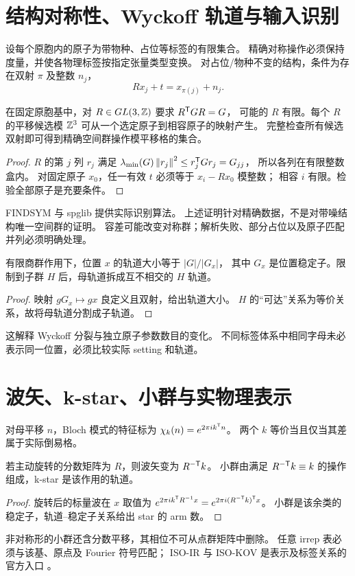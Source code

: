 \section{结构对称性、Wyckoff 轨道与输入识别}\label{sec:symmetry}
设每个原胞内的原子为带物种、占位等标签的有限集合。
精确对称操作必须保持度量，并使各物理标签按指定张量类型变换。
对占位/物种不变的结构，条件为存在双射 $\pi$ 及整数 $n_j$，
\[
 Rx_j+t=x_{\pi(j)}+n_j.
\]
\begin{proposition}[理想输入下的有限对称搜索]
在固定原胞基中，对 $R\in GL(3,\mathbb Z)$ 要求 $R^\mathsf T GR=G$，
可能的 $R$ 有限。每个 $R$ 的平移候选模 $\mathbb Z^3$ 可从一个选定原子到相容原子的映射产生。
完整检查所有候选双射即可得到精确空间群操作模平移格的集合。
\end{proposition}
\begin{proof}
$R$ 的第 $j$ 列 $r_j$ 满足
$\lambda_{\min}(G)\left\lVert r_j\right\rVert^2\leq r_j^\mathsf T Gr_j=G_{jj}$，
所以各列在有限整数盒内。
对固定原子 $x_0$，任一有效 $t$ 必须等于 $x_i-Rx_0$ 模整数；
相容 $i$ 有限。检验全部原子是充要条件。
\end{proof}
FINDSYM 与 spglib 提供实际识别算法\citep{Findsym2005,Spglib2024}。
上述证明针对精确数据，不是对带噪结构唯一空间群的证明。
容差可能改变对称群；解析失败、部分占位以及原子匹配并列必须明确处理。

\begin{theorem}[轨道与局部对称]
有限商群作用下，位置 $x$ 的轨道大小等于 $|G|/|G_x|$，
其中 $G_x$ 是位置稳定子。限制到子群 $H$ 后，母轨道拆成互不相交的 $H$ 轨道。
\end{theorem}
\begin{proof}
映射 $gG_x\mapsto gx$ 良定义且双射，给出轨道大小。
$H$ 的“可达”关系为等价关系，故将母轨道分割成子轨道。
\end{proof}
这解释 Wyckoff 分裂与独立原子参数数目的变化。
不同标签体系中相同字母未必表示同一位置，必须比较实际 setting 和轨道。

\section{波矢、k-star、小群与实物理表示}\label{sec:k}
对母平移 $n$，Bloch 模式的特征标为
$\chi_k(n)=e^{2\pi i k^\mathsf T n}$。
两个 $k$ 等价当且仅当其差属于实际倒易格。
\begin{proposition}[倒易作用与小群]
若主动旋转的分数矩阵为 $R$，则波矢变为 $R^{-\mathsf T}k$。
小群由满足 $R^{-\mathsf T}k\equiv k$ 的操作组成，k-star 是该作用的轨道。
\end{proposition}
\begin{proof}
旋转后的标量波在 $x$ 取值为
$e^{2\pi i k^\mathsf T R^{-1}x}=e^{2\pi i(R^{-\mathsf T}k)^\mathsf T x}$。
小群是该余类的稳定子，轨道--稳定子关系给出 star 的 arm 数。
\end{proof}
非对称形的小群还含分数平移，其相位不可从点群矩阵中删除。
任意 irrep 表必须与该基、原点及 Fourier 符号匹配；
ISO-IR 与 ISO-KOV 是表示及标签关系的官方入口
\citep{Stokes2013,IsoIr,IsoKov}。

